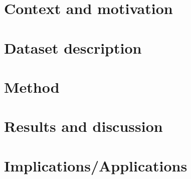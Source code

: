 \documentclass[11pt]{article}
\begin{document}

\pagebreak{}


\tableofcontents
{}
\setcounter{page}{2}
\pagebreak{}


\listoftables
\pagebreak{}


\setcounter{page}{1}


\section{Context and motivation}



\section{Dataset description}



\section{Method}



\section{Results and discussion}



\section{Implications/Applications}



\newpage




\end{document}
